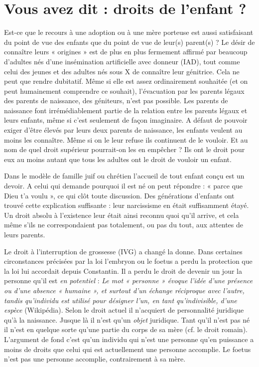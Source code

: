  
 \section{Vous avez dit : droits de l'enfant ?}
 
 Est-ce que le recours à une adoption ou à une mère porteuse est aussi satisfaisant du point de vue des enfants que du point de vue de leur(s) parent(s) ? Le désir de connaître leurs « origines » est de plus en plus fermement affirmé par beaucoup d'adultes nés d'une insémination artificielle avec donneur (IAD), tout comme celui des jeunes et des adultes nés sous X de connaître leur génitrice. Cela ne peut que rendre dubitatif. Même si elle est assez ordinairement souhaitée (et on peut humainement comprendre ce souhait), l'évacuation par les parents légaux des parents de naissance, des géniteurs, n'est pas possible. Les parents de naissance font irrémédiablement partie de la relation entre les parents légaux et leurs enfants, même si c'est seulement de façon imaginaire. A défaut de pouvoir exiger d'être élevés par leurs deux parents de naissance, les enfants veulent au moins les connaître. Même si on le leur refuse ils continuent de le vouloir. Et au nom de quel droit supérieur pourrait-on les en empêcher ? Ils ont le droit pour eux au moins autant que tous les adultes ont le droit de vouloir un enfant. 
 
 Dans le modèle de famille juif ou chrétien l'accueil de tout enfant conçu est un devoir. A celui qui demande pourquoi il est né on peut répondre : « parce que Dieu t'a voulu », ce qui clôt toute discussion. Des générations d'enfants ont trouvé cette explication suffisante : leur narcissisme en était suffisamment étayé. Un droit absolu à l'existence leur était ainsi reconnu quoi qu'il arrive, et cela même s'ils ne correspondaient pas totalement, ou pas du tout, aux attentes de leurs parents.
  
 Le droit à l'interruption de grossesse (IVG) a changé la donne. Dans certaines circonstances précisées par la loi l'embryon ou le foetus a perdu la protection que la loi lui accordait depuis Constantin. Il a perdu le droit de devenir un jour la personne qu'il est \emph{en potentiel} : {\emph{Le mot « personne » évoque l'idée d'une présence ou d'une absence « humaine », et surtout d'un échange réciproque avec l'autre, tandis qu'individu est utilisé pour désigner l'un, en tant qu'indivisible, d'une espèce}} (Wikipédia). Selon le droit actuel il n'acquiert de personnalité juridique qu'à la naissance. Jusque là il n'est qu'un \emph{objet} juridique. Tant qu'il n'est pas né il n'est en quelque sorte qu'une partie du corps de sa mère (cf. le droit romain). L'argument de fond c'est qu'un individu qui n'est une personne qu'en puissance a moins de droits que celui qui est actuellement une personne accomplie. Le foetus n'est pas une personne accomplie, contrairement à sa mère. 

